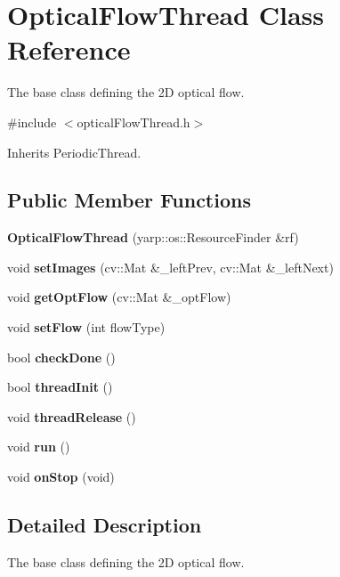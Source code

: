 \section{Optical\+Flow\+Thread Class Reference}
\label{classOpticalFlowThread}


The base class defining the 2D optical flow.  




{\ttfamily \#include $<$optical\+Flow\+Thread.\+h$>$}



Inherits Periodic\+Thread.

\subsection*{Public Member Functions}
\begin{DoxyCompactItemize}
\item 
\mbox{\label{classOpticalFlowThread_a2d90f6c196cc33c7d81ec35468896c8c}} 
{\bfseries Optical\+Flow\+Thread} (yarp\+::os\+::\+Resource\+Finder \&rf)
\item 
\mbox{\label{classOpticalFlowThread_a6c04e7a9e28e792ff5d81f65ae11d67a}} 
void {\bfseries set\+Images} (cv\+::\+Mat \&\+\_\+left\+Prev, cv\+::\+Mat \&\+\_\+left\+Next)
\item 
\mbox{\label{classOpticalFlowThread_ab052e551a0ad2f625b72661d9e8a2289}} 
void {\bfseries get\+Opt\+Flow} (cv\+::\+Mat \&\+\_\+opt\+Flow)
\item 
\mbox{\label{classOpticalFlowThread_a2819e22da7950422f51f6331485468cf}} 
void {\bfseries set\+Flow} (int flow\+Type)
\item 
\mbox{\label{classOpticalFlowThread_a8b201fe043a596728a9925bce91b2846}} 
bool {\bfseries check\+Done} ()
\item 
\mbox{\label{classOpticalFlowThread_aecc4312f7a794c9668dd2e8bb6099939}} 
bool {\bfseries thread\+Init} ()
\item 
\mbox{\label{classOpticalFlowThread_a90234a9a3f4aa898413cfb36aac4a979}} 
void {\bfseries thread\+Release} ()
\item 
\mbox{\label{classOpticalFlowThread_a0329bf989f05e6715bbaccde904fe88f}} 
void {\bfseries run} ()
\item 
\mbox{\label{classOpticalFlowThread_ac30f26065348c602f160421aa69a7ed3}} 
void {\bfseries on\+Stop} (void)
\end{DoxyCompactItemize}


\subsection{Detailed Description}
The base class defining the 2D optical flow. 

